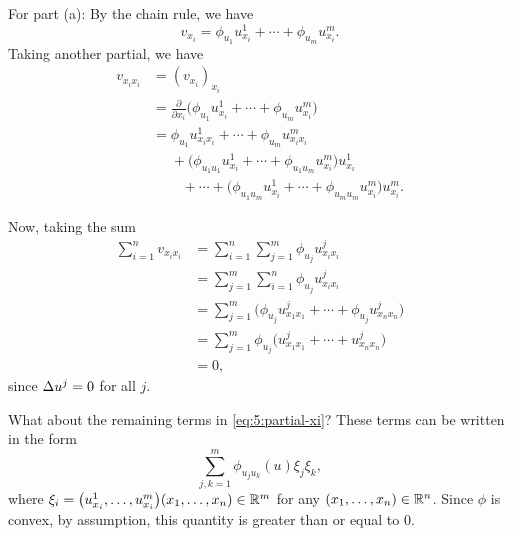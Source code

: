\begin{solution*}
  For part (a): By the chain rule, we have
  \[
    v_{x_i}=\phi_{u_1}u^1_{x_i}+\dotsb+\phi_{u_m}u^m_{x_i}.
  \]
  Taking another partial, we have
  \begin{equation}
    \label{eq:5:partial-xi}
    \begin{aligned}
      v_{x_ix_i}
      &=(v_{x_i})_{x_i}\\
      &=\tfrac{\partial}{\partial x_i}
      \bigl(\phi_{u_1}u^1_{x_i}+\dotsb+\phi_{u_m}u^m_{x_i}\bigr)\\
      &=\phi_{u_1}u^1_{x_ix_i}+\dotsb+\phi_{u_m}u_{x_ix_i}^m\\
      &\phantom{{}={}}+\bigl(\phi_{u_1u_1}u_{x_i}^1
      +\dotsb+\phi_{u_1u_m}u_{x_i}^m\bigr)u_{x_i}^1\\
      &\phantom{{}=+{}}+\dotsb+\bigl(\phi_{u_1u_m}u_{x_i}^1
      +\dotsb+\phi_{u_mu_m}u_{x_i}^m\bigr)u_{x_i}^m.
    \end{aligned}
  \end{equation}

  Now, taking the sum
  \begin{align*}
    \sum_{i=1}^nv_{x_ix_i}
    &=\sum_{i=1}^n\sum_{j=1}^m\phi_{u_j}u^j_{x_ix_i}\\
    &=\sum_{j=1}^m\sum_{i=1}^n\phi_{u_j}u^j_{x_ix_i}\\
    &=\sum_{j=1}^m\bigl(\phi_{u_j}u^j_{x_1x_1}+\dotsb+\phi_{u_j}u^j_{x_nx_n}\bigr)\\
    &=\sum_{j=1}^m\phi_{u_j}\bigl(u^j_{x_1x_1}+\dotsb+u^j_{x_nx_n}\bigr)\\
    &=0,
  \end{align*}
  since \(\Delta u^j=0\) for all \(j\).

  What about the remaining terms in \eqref{eq:5:partial-xi}? These terms
  can be written in the form
  \[
    \sum_{j,k=1}^m\phi_{u_ju_k}(u)\xi_j\xi_k,
  \]
  where
  \(\xi_i=\bigl(u^1_{x_i},\dotsc,u^m_{x_i}\bigr)(x_1,\dotsc,x_n)\in\mathbb{R}^m\)
  for any \((x_1,\dotsc,x_n)\in\mathbb{R}^n\). Since \(\phi\) is convex, by
  assumption, this quantity is greater than or equal to \(0\).


\end{solution*}
